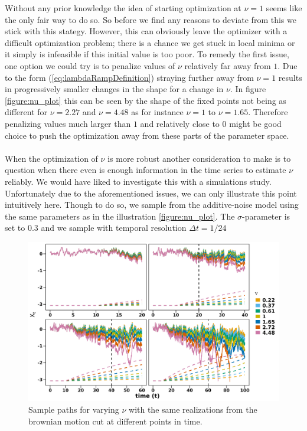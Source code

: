  Without any prior knowledge the idea of starting optimization at $\nu = 1$ seems like the only fair way to do so. So before we find any reasons to deviate from this we stick with this stategy. However, this can obviously leave the optimizer with a difficult optimization problem; there is a chance we get stuck in local minima or it simply is infeasible if this initial value is too poor. To remedy the first issue, one option we could try is to penalize values of $\nu$ relatively far away from $1$. Due to the form (\ref{eq:lambdaRampDefinition}) straying further away from $\nu = 1$ results in progressively smaller changes in the shape for a change in $\nu$. In figure \ref{figure:nu_plot} this can be seen by the shape of the fixed points not being as different for $\nu = 2.27$ and $\nu = 4.48$ as for instance $\nu = 1$ to $\nu = 1.65$. Therefore penalizing values much larger than $1$ and relatively close to $0$ might be good choice to push the optimization away from these parts of the parameter space. \\\\
When the optimization of $\nu$ is more robust another consideration to make is to question when there even is enough information in the time series to estimate $\nu$ reliably. We would have liked to investigate this with a simulations study. Unfortunately due to the aforementioned issues, we can only illustrate this point intuitively here. Though to do so, we sample from the additive-noise model using the same parameters as in the illustration \ref{figure:nu_plot}. The $\sigma$-parameter is set to $0.3$ and we sample with temporal resolution $\Delta t = 1/24$
\begin{figure}[h!]
    \begin{center}
    \includegraphics[scale = .13]{figures/mu_simulations_discussion_plot.jpeg}
    \caption{Sample paths for varying $\nu$ with the same realizations from the brownian motion cut at different points in time.}
    \label{figure:mu_simulations_discussion_plot}
    \end{center}
\end{figure}\\
